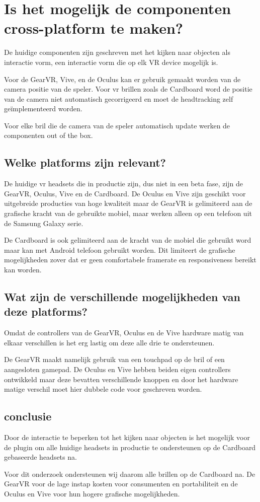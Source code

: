 \section{Is het mogelijk de componenten cross-platform te maken?}
De huidige componenten zijn geschreven met het kijken naar objecten als interactie vorm, een interactie vorm die op elk VR device mogelijk is. 

Voor de GearVR, Vive, en de Oculus kan er gebruik gemaakt worden van de camera positie van de speler. Voor \gls{vr} brillen zoals de Cardboard word de positie van de camera niet automatisch gecorrigeerd en moet de headtracking zelf geïmplementeerd worden. 

Voor elke bril die de camera van de speler automatisch update werken de componenten out of the box.

\subsection{Welke platforms zijn relevant?}
De huidige \gls{vr} headsets die in productie zijn, dus niet in een beta fase, zijn de GearVR, Oculus, Vive en de Cardboard. De Oculus en Vive zijn geschikt voor uitgebreide producties van hoge kwaliteit maar de GearVR is gelimiteerd aan de grafische kracht van de gebruikte mobiel, maar werken alleen op een telefoon uit de Samsung Galaxy serie. 

De Cardboard is ook gelimiteerd aan de kracht van de mobiel die gebruikt word maar kan met Android telefoon gebruikt worden. Dit limiteert de grafische mogelijkheden zover dat er geen comfortabele framerate en responsiveness bereikt kan worden.

\subsection{Wat zijn de verschillende mogelijkheden van deze platforms?}
Omdat de controllers van de GearVR, Oculus en de Vive hardware matig van elkaar verschillen is het erg lastig om deze alle drie te ondersteunen. 

De GearVR maakt namelijk gebruik van een touchpad op de bril of een aangesloten gamepad. De Oculus en Vive hebben beiden eigen controllers ontwikkeld maar deze bevatten verschillende knoppen en door het hardware matige verschil moet hier dubbele code voor geschreven worden.

\subsection{conclusie}
Door de interactie te beperken tot het kijken naar objecten is het mogelijk voor de plugin om alle huidige headsets in productie te ondersteunen op de Cardboard gebaseerde headsets na.

Voor dit onderzoek ondersteunen wij daarom alle brillen op de Cardboard na. De GearVR voor de lage instap kosten voor consumenten en portabiliteit en de Oculus en Vive voor hun hogere grafische mogelijkheden.